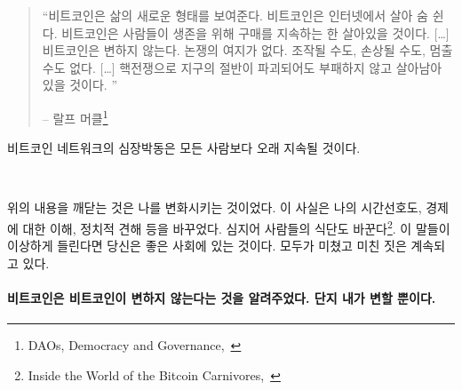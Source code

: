 \begin{quotation}\begin{samepage}
		\enquote{비트코인은 삶의 새로운 형태를 보여준다. 비트코인은 인터넷에서 살아 숨 쉰다. 비트코인은
			사람들이 생존을 위해 구매를 지속하는 한 살아있을 것이다. [\ldots] 비트코인은 변하지 않는다. 논쟁의 여지가 없다.
			조작될 수도, 손상될 수도, 멈출 수도 없다. [\ldots] 핵전쟁으로 지구의 절반이 파괴되어도 
			부패하지 않고 살아남아 있을 것이다. }
		\begin{flushright} -- 랄프 머클\footnote{DAOs, Democracy and
				Governance,~\cite{merkle-dao}}
\end{flushright}\end{samepage}\end{quotation}


비트코인 네트워크의 심장박동은 모든 사람보다 오래 지속될 것이다.

~


위의 내용을 깨닫는 것은 나를 변화시키는 것이었다. 
이 사실은 나의 시간선호도, 경제에 대한 이해, 정치적 견해 등을 바꾸었다. 
심지어 사람들의 식단도 바꾼다\footnote{Inside the World of the Bitcoin Carnivores,~\cite{carnivores}}. 
이 말들이 이상하게 들린다면 당신은 좋은 사회에 있는 것이다. 
모두가 미쳤고 미친 짓은 계속되고 있다.
~

\paragraph{비트코인은 비트코인이 변하지 않는다는 것을 알려주었다. 단지 내가 변할 뿐이다.}

